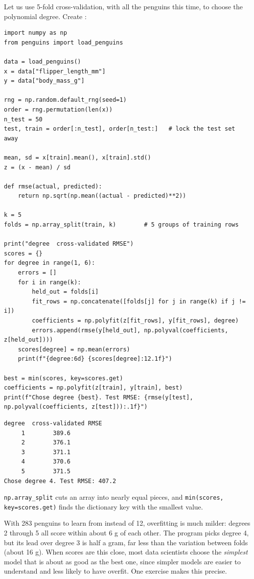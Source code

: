 Let us use 5-fold cross-validation, with all the penguins this time, to choose the polynomial degree.
Create :

\begin{verbatim}
import numpy as np
from penguins import load_penguins

data = load_penguins()
x = data["flipper_length_mm"]
y = data["body_mass_g"]

rng = np.random.default_rng(seed=1)
order = rng.permutation(len(x))
n_test = 50
test, train = order[:n_test], order[n_test:]   # lock the test set away

mean, sd = x[train].mean(), x[train].std()
z = (x - mean) / sd

def rmse(actual, predicted):
    return np.sqrt(np.mean((actual - predicted)**2))

k = 5
folds = np.array_split(train, k)        # 5 groups of training rows

print("degree  cross-validated RMSE")
scores = {}
for degree in range(1, 6):
    errors = []
    for i in range(k):
        held_out = folds[i]
        fit_rows = np.concatenate([folds[j] for j in range(k) if j != i])
        coefficients = np.polyfit(z[fit_rows], y[fit_rows], degree)
        errors.append(rmse(y[held_out], np.polyval(coefficients, z[held_out])))
    scores[degree] = np.mean(errors)
    print(f"{degree:6d} {scores[degree]:12.1f}")

best = min(scores, key=scores.get)
coefficients = np.polyfit(z[train], y[train], best)
print(f"Chose degree {best}. Test RMSE: {rmse(y[test], np.polyval(coefficients, z[test])):.1f}")
\end{verbatim}

\begin{verbatim}
degree  cross-validated RMSE
     1        389.6
     2        376.1
     3        371.1
     4        370.6
     5        371.5
Chose degree 4. Test RMSE: 407.2
\end{verbatim}

\verb|np.array_split| cuts an array into nearly equal pieces, and \verb|min(scores, key=scores.get)| finds the
dictionary key with the smallest value.

With 283 penguins to learn from instead of 12, overfitting is much milder: degrees 2 through 5 all score
within about 6 g of each other. The program picks degree 4, but its lead over degree 3 is half a gram, far less
than the variation between folds (about 16 g). When scores are this close, most data scientists choose the
\emph{simplest} model that is about as good as the best one, since simpler models are easier to understand and
less likely to have overfit. One exercise makes this precise.

